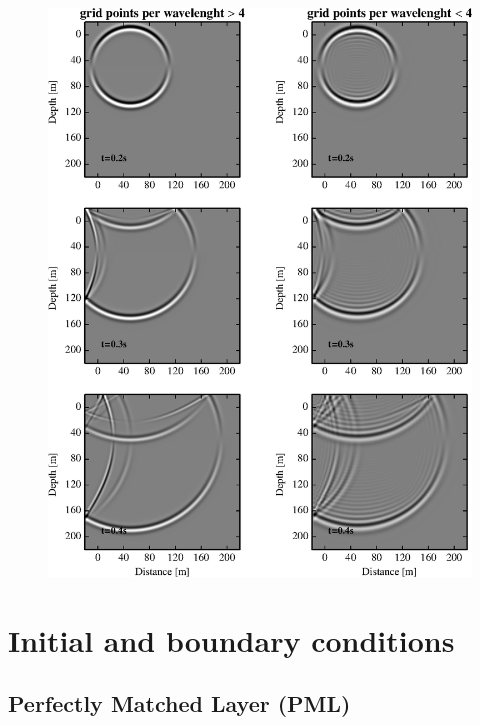 \documentclass{gnulike}
\begin{document}
\begin{figure}[!ht]
  \centering
  \includegraphics[scale=1.0]{fig/validation_dispersion.eps}
\end{figure}

\section{Initial and boundary conditions}

\subsection{Perfectly Matched Layer (PML)}

\cite{berenger1994perfectly}
\end{document}
